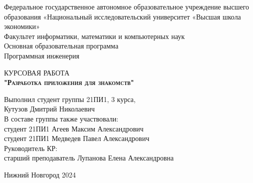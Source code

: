 \begin{titlepage}
\newpage

{
\begin{center}
Федеральное государственное автономное образовательное учреждение высшего образования «Национальный исследовательский университет «Высшая школа экономики»
\\
\bigskip
Факультет информатики, математики и компьютерных наук \\
Основная образовательная программа \\
Программная инженерия \\
\end{center}
}

\vspace{8em}

\begin{center}
{\Large КУРСОВАЯ РАБОТА}\\
\textsc{\textbf{
"Разработка приложения для знакомств"}}
\end{center}

\vspace{2em}

{
\hfill\parbox{16cm}{
\hspace*{5cm}\hspace*{-5cm}Выполнил студент группы 21ПИ1, 3 курса,\\
 Кутузов Дмитрий Николаевич\\

\hspace*{5cm}\hspace*{-5cm}В составе группы также участвовали:\\
студент 21ПИ1 Агеев Максим Александрович\\
студент 21ПИ1 Медведев Павел Александрович\\
 
\hspace*{5cm}\hspace*{-5cm}Руководитель КР:\\
старший преподаватель Лупанова Елена Александровна
\\
}
}

\vspace{\fill}

\begin{center}
Нижний Новгород 2024
\end{center}

\end{titlepage}